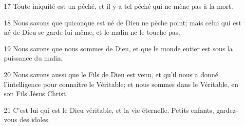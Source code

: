 \par 17 Toute iniquité est un péché, et il y a tel péché qui ne mène pas à la mort.
\par 18 Nous savons que quiconque est né de Dieu ne pèche point; mais celui qui est né de Dieu se garde lui-même, et le malin ne le touche pas.
\par 19 Nous savons que nous sommes de Dieu, et que le monde entier est sous la puissance du malin.
\par 20 Nous savons aussi que le Fils de Dieu est venu, et qu'il nous a donné l'intelligence pour connaître le Véritable; et nous sommes dans le Véritable, en son Fils Jésus Christ.
\par 21 C'est lui qui est le Dieu véritable, et la vie éternelle. Petits enfants, gardez-vous des idoles.


